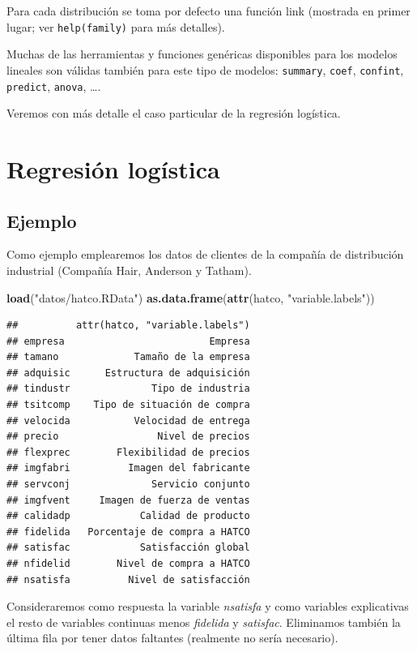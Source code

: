 \documentclass[]{book}
\newenvironment{Shaded}{\begin{snugshade}}{\end{snugshade}}
\newcommand{\KeywordTok}[1]{\textcolor[rgb]{0.13,0.29,0.53}{\textbf{#1}}}
\newcommand{\StringTok}[1]{\textcolor[rgb]{0.31,0.60,0.02}{#1}}
\newcommand{\NormalTok}[1]{#1}
\begin{document}
Para cada distribución se toma por defecto una función link (mostrada en
primer lugar; ver \texttt{help(family)} para más detalles).

Muchas de las herramientas y funciones genéricas disponibles para los
modelos lineales son válidas también para este tipo de modelos:
\texttt{summary}, \texttt{coef}, \texttt{confint}, \texttt{predict},
\texttt{anova}, \ldots{}.

Veremos con más detalle el caso particular de la regresión logística.

\section{Regresión logística}\label{regresion-logistica}

\subsection{Ejemplo}\label{ejemplo-2}

Como ejemplo emplearemos los datos de clientes de la compañía de
distribución industrial (Compañía Hair, Anderson y Tatham).

\begin{Shaded}
\begin{Highlighting}[]
\KeywordTok{load}\NormalTok{(}\StringTok{"datos/hatco.RData"}\NormalTok{)}
\KeywordTok{as.data.frame}\NormalTok{(}\KeywordTok{attr}\NormalTok{(hatco, }\StringTok{"variable.labels"}\NormalTok{))}
\end{Highlighting}
\end{Shaded}

\begin{verbatim}
##          attr(hatco, "variable.labels")
## empresa                         Empresa
## tamano             Tamaño de la empresa
## adquisic      Estructura de adquisición
## tindustr              Tipo de industria
## tsitcomp    Tipo de situación de compra
## velocida           Velocidad de entrega
## precio                 Nivel de precios
## flexprec        Flexibilidad de precios
## imgfabri          Imagen del fabricante
## servconj              Servicio conjunto
## imgfvent     Imagen de fuerza de ventas
## calidadp            Calidad de producto
## fidelida   Porcentaje de compra a HATCO
## satisfac            Satisfacción global
## nfidelid        Nivel de compra a HATCO
## nsatisfa          Nivel de satisfacción
\end{verbatim}

Consideraremos como respuesta la variable \emph{nsatisfa} y como
variables explicativas el resto de variables continuas menos
\emph{fidelida} y \emph{satisfac}. Eliminamos también la última fila por
tener datos faltantes (realmente no sería necesario).
\end{document}

